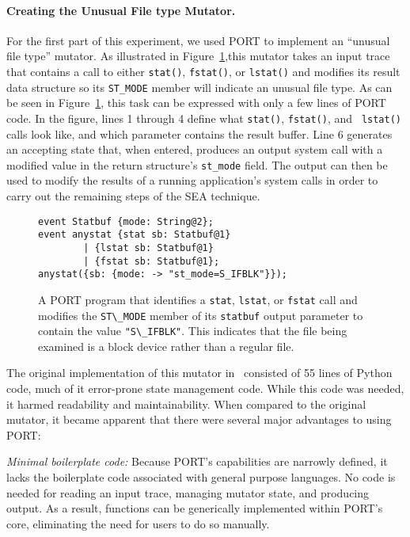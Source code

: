 \paragraph{Creating the Unusual File type Mutator.}
\label{subsub:UnusualFiletype}
For the first part of this experiment,
we used PORT to implement an ``unusual file type''
mutator.
As illustrated in Figure~\ref{lst:SEAListings},this mutator
takes an input trace
that contains a call to either {\tt stat()},
{\tt fstat()},
or {\tt lstat()}
and modifies its result data structure so
its {\tt ST\_MODE} member will indicate an unusual file type.
As can be seen in
Figure~\ref{lst:SEAListings}, this task can be expressed with only a few lines of PORT code.  In the figure,
lines 1 through 4 define what {\tt stat()}, {\tt fstat()}, and {\tt
lstat()} calls look like, and which parameter contains the result buffer.
Line 6 generates an accepting state that, when entered, produces an output
system call with a modified value in the return structure's {\tt st\_mode}
field.  The output can then be used to modify the results of a running
application's system calls in order to carry out the remaining steps of the
SEA technique.

\begin{figure}
\centering
\begin{lstlisting}[basicstyle=\ttfamily\scriptsize]
event Statbuf {mode: String@2};
event anystat {stat sb: Statbuf@1}
        | {lstat sb: Statbuf@1} 
        | {fstat sb: Statbuf@1};
anystat({sb: {mode: -> "st_mode=S_IFBLK"}});
\end{lstlisting}
\caption{A PORT program that
identifies a \texttt{stat}, \texttt{lstat}, or \texttt{fstat} call and modifies
  the \lstinline+ST\_MODE+ member of its \lstinline+statbuf+ output parameter to contain the value
  \lstinline+"S\_IFBLK"+. This indicates that the file being examined is a block device rather than a regular file.}
\label{lst:SEAListings}
\end{figure}

The original implementation of this mutator in~\cite{DBLP:conf/issre/MooreCFW19} consisted of 55 lines
of Python code, much of it error-prone state management code. While this code was needed, it harmed
readability and maintainability.
When compared to the original mutator, it became apparent that there were
several major advantages
to using
PORT:

\textit{Minimal boilerplate code:} Because PORT's capabilities are narrowly defined, it lacks the boilerplate
code associated with general purpose languages. No code is needed for 
reading an input trace, managing mutator state, and producing output.
As a result,
functions can be generically implemented within PORT's core, eliminating
the need for users to do so manually.

